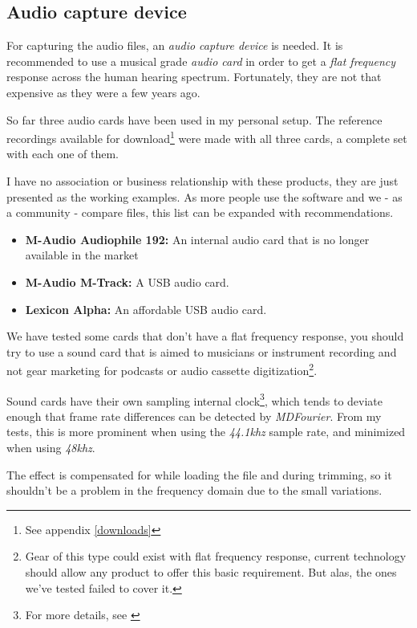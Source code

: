 \documentclass[10pt,a4paper]{report}
\newcommand{\fkhz}[1]{\textit{#1\acrshort{khz}}}
\begin{document}
\begin{appendices}
\section{Audio capture device}
\label{audiocards}
For capturing the audio files, an \textit{audio capture device} is needed. It is recommended to use a musical grade \textit{audio card} in order to get a \textit{flat frequency} response across the human hearing spectrum. Fortunately, they are not that expensive as they were a few years ago.

So far three audio cards have been used in my personal setup. The reference recordings available for download\footnote{See appendix \ref{downloads}} were made with all three cards, a complete set with each one of them.

I have no association or business relationship with these products, they are just presented as the working examples. As more people use the software and we - as a community - compare files, this list can be expanded with recommendations.

\begin{itemize}
	\item \textbf{M-Audio Audiophile 192:} An internal audio card that is no longer available in the market \cite{maudio}
	\item \textbf{M-Audio M-Track:} A USB audio card. \cite{maudiomtrack}
	\item \textbf{Lexicon Alpha:} An affordable USB audio card. \cite{lexicon}
\end{itemize}

We have tested some cards that don't have a flat frequency response, you should try to use a sound card that is aimed to musicians or instrument recording and not gear marketing for podcasts or audio cassette digitization\footnote{Gear of this type could exist with flat frequency response, current technology should allow any product to offer this basic requirement. But alas, the ones we've tested failed to cover it.}.

Sound cards have their own sampling internal clock\footnote{For more details, see \cite{SoundCardClock} \cite{soundcardtiming} \cite{gwsoundcardtiming}}, which tends to deviate enough that frame rate differences can be detected by \textit{MDFourier}. From my tests, this is more prominent when using the \fkhz{44.1} sample rate, and minimized when using \fkhz{48}. 

The effect is compensated for while loading the file and during trimming, so it shouldn't be a problem in the frequency domain due to the small variations. 


\end{appendices}
\end{document}
